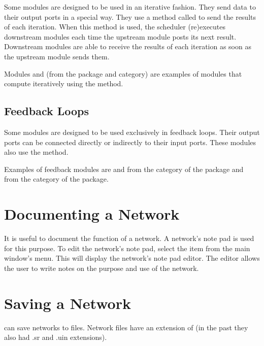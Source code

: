 Some modules are designed to be used in an iterative fashion.  They send
data to their output ports in a special way.  They use a method called
 to send the results of each iteration.  When
this method is used, the scheduler (re)executes downstream modules each time
the upstream module posts its next result.  Downstream modules are
able to receive the results of each iteration as soon as the
upstream module sends them.

Modules  and  (from the
\package{\sr} package and  category) are examples of modules
that compute iteratively using the  method.

\subsection{Feedback Loops}

Some modules are designed to be used exclusively in feedback
loops. Their output ports can be connected
directly or indirectly to their input ports.  These modules also use the
 method.

Examples of feedback modules are  and
 from the  category of the
 package and  from the
 category of the  package.

\section{Documenting a Network}
\label{sec:docnetwork}

It is useful to document the function of a network.  A network's note
pad is used for this purpose.  To edit the network's note pad,
select the  item from the main window's 
menu.  This will display the network's note pad editor.  The editor
allows the user to write notes on the purpose and use of the network.

\section{Saving a Network}
\label{sec:savenet}

\sr{} can save networks to files.  Network files have an extension of
 (in the past they also had .sr and .uin
extensions).  

